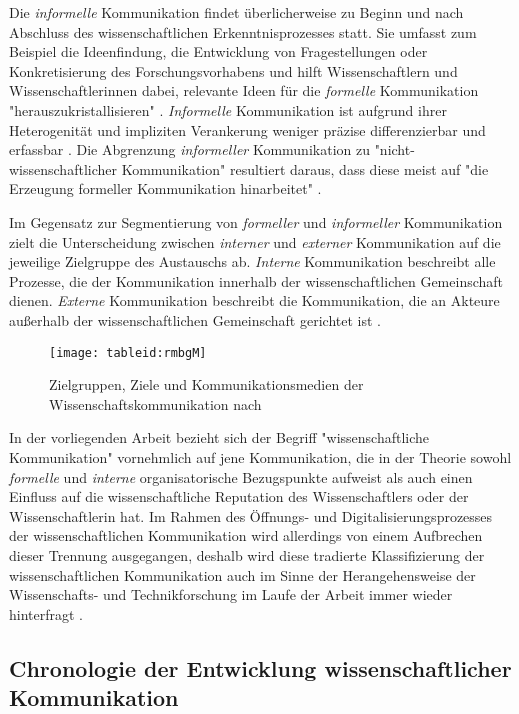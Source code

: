 Die \textit{informelle} Kommunikation findet überlicherweise zu Beginn und nach Abschluss des wissenschaftlichen Erkenntnisprozesses statt. Sie umfasst zum Beispiel die Ideenfindung, die Entwicklung von Fragestellungen oder Konkretisierung des Forschungsvorhabens und hilft Wissenschaftlern und Wissenschaftlerinnen dabei, relevante Ideen für die \textit{formelle} Kommunikation "herauszukristallisieren" \cite{Hanekop_2014}. \textit{Informelle} Kommunikation ist aufgrund ihrer Heterogenität und impliziten Verankerung weniger präzise differenzierbar und erfassbar \cite{kaden_2009_library}. Die Abgrenzung \textit{informeller} Kommunikation zu "nicht-wissenschaftlicher Kommunikation" resultiert daraus, dass diese meist auf "die Erzeugung formeller Kommunikation hinarbeitet" \cite{kaden_2009_library}.

Im Gegensatz zur Segmentierung von \textit{formeller} und \textit{informeller} Kommunikation zielt die Unterscheidung zwischen \textit{interner} und \textit{externer} Kommunikation auf die jeweilige Zielgruppe des Austauschs ab. \textit{Interne} Kommunikation beschreibt alle Prozesse, die der Kommunikation innerhalb der wissenschaftlichen Gemeinschaft dienen. \textit{Externe} Kommunikation beschreibt die Kommunikation, die an Akteure außerhalb der wissenschaftlichen Gemeinschaft gerichtet ist \cite{Konneker_2013}.

\begin{figure}[h!]
\texttt{[image: tableid:rmbgM]}
\caption{Zielgruppen, Ziele und Kommunikationsmedien der Wissenschaftskommunikation nach  \cite{seidenfaden_2005_kommunikation}}
\end{figure}

In der vorliegenden Arbeit bezieht sich der Begriff "wissenschaftliche Kommunikation" vornehmlich auf jene Kommunikation, die in der Theorie sowohl \textit{formelle} und \textit{interne} organisatorische Bezugspunkte aufweist als auch einen Einfluss auf die wissenschaftliche Reputation des Wissenschaftlers oder der Wissenschaftlerin hat. Im Rahmen des Öffnungs- und Digitalisierungsprozesses der wissenschaftlichen Kommunikation wird allerdings von einem Aufbrechen dieser Trennung ausgegangen, deshalb wird diese tradierte Klassifizierung der wissenschaftlichen Kommunikation auch im Sinne der Herangehensweise der Wissenschafts- und Technikforschung im Laufe der Arbeit immer wieder hinterfragt  \cite[:326]{bowker_2000_sorting}.

\subsection{Chronologie der Entwicklung wissenschaftlicher Kommunikation}

